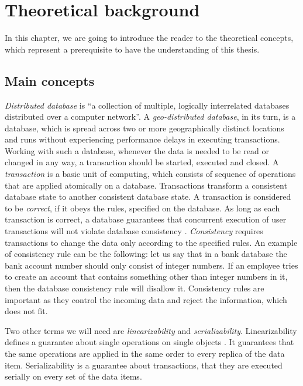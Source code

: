 \chapter{Theoretical background}
\label{Background}

In this chapter, we are going to introduce the reader to the theoretical concepts, which represent a prerequisite to have the understanding of this thesis.

\section{Main concepts}

\textit{Distributed database} is ``a collection of multiple, logically interrelated databases distributed over a computer network''\cite{11}. A \textit{geo-distributed database}, in its turn, is a database, which is spread across two or more geographically distinct locations and runs without experiencing performance delays in executing transactions. Working with such a database, whenever the data is needed to be read or changed in any way, a transaction should be started, executed and closed. A \textit{transaction} is a basic unit of computing, which consists of sequence of operations that are applied atomically on a database. Transactions transform a consistent database state to another consistent database state. A transaction is considered to be \textit{correct}, if it obeys the rules, specified on the database. As long as each transaction is correct, a database guarantees that concurrent execution of user transactions will not violate database consistency \cite{11}. \textit{Consistency} requires transactions to change the data only according to the specified rules. An example of consistency rule can be the following: let us say that in a bank database the bank account number should only consist of integer numbers. If an employee tries to create an account that contains something other than integer numbers in it, then the database consistency rule will disallow it. Consistency rules are important as they control the incoming data and reject the information, which does not fit.

Two other terms we will need are \textit{linearizability} and \textit{serializability}. Linearizability defines a guarantee about single operations on single objects \cite{13}. It guarantees that the same operations are applied in the same order to every replica of the data item\cite{12}. Serializability is a guarantee about transactions, that they are executed serially on every set of the data items\cite{12}.

